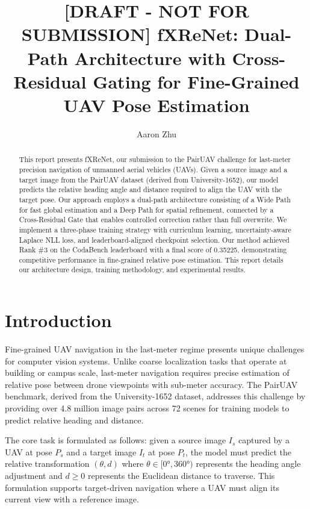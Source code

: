 \documentclass[sigconf,nonacm]{acmart}
\begin{document}
\title{[DRAFT - NOT FOR SUBMISSION] fXReNet: Dual-Path Architecture with Cross-Residual Gating for Fine-Grained UAV Pose Estimation}

\author{Aaron Zhu}

\begin{abstract}
This report presents fXReNet, our submission to the PairUAV challenge for last-meter precision navigation of unmanned aerial vehicles (UAVs). Given a source image and a target image from the PairUAV dataset (derived from University-1652), our model predicts the relative heading angle and distance required to align the UAV with the target pose. Our approach employs a dual-path architecture consisting of a Wide Path for fast global estimation and a Deep Path for spatial refinement, connected by a Cross-Residual Gate that enables controlled correction rather than full overwrite. We implement a three-phase training strategy with curriculum learning, uncertainty-aware Laplace NLL loss, and leaderboard-aligned checkpoint selection. Our method achieved Rank \#3 on the CodaBench leaderboard with a final score of 0.35225, demonstrating competitive performance in fine-grained relative pose estimation. This report details our architecture design, training methodology, and experimental results.
\end{abstract}

\maketitle

\section{Introduction}

Fine-grained UAV navigation in the last-meter regime presents unique challenges for computer vision systems. Unlike coarse localization tasks that operate at building or campus scale, last-meter navigation requires precise estimation of relative pose between drone viewpoints with sub-meter accuracy. The PairUAV benchmark, derived from the University-1652 dataset, addresses this challenge by providing over 4.8 million image pairs across 72 scenes for training models to predict relative heading and distance.

The core task is formulated as follows: given a source image $I_s$ captured by a UAV at pose $P_s$ and a target image $I_t$ at pose $P_t$, the model must predict the relative transformation $(\theta, d)$ where $\theta \in [0°, 360°)$ represents the heading angle adjustment and $d \geq 0$ represents the Euclidean distance to traverse. This formulation supports target-driven navigation where a UAV must align its current view with a reference image.
\end{document}
